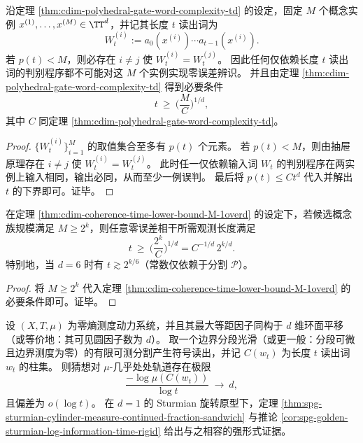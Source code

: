 \begin{theorem}[圆维诱导的零误差相干下界]\label{thm:cdim-coherence-time-lower-bound-M-1overd}
沿定理 \ref{thm:cdim-polyhedral-gate-word-complexity-td} 的设定，固定 \(M\) 个概念实例 \(x^{(1)},\dots,x^{(M)}\in\TT^d\)，并记其长度 \(t\) 读出词为
\[
W_t^{(i)}:=a_0(x^{(i)})\cdots a_{t-1}(x^{(i)}).
\]
若 \(p(t)<M\)，则必存在 \(i\neq j\) 使 \(W_t^{(i)}=W_t^{(j)}\)。
因此任何仅依赖长度 \(t\) 读出词的判别程序都不可能对这 \(M\) 个实例实现零误差辨识。
并且由定理 \ref{thm:cdim-polyhedral-gate-word-complexity-td} 得到必要条件
\[
t\ \ge\ \Big(\frac{M}{C}\Big)^{1/d},
\]
其中 \(C\) 同定理 \ref{thm:cdim-polyhedral-gate-word-complexity-td}。
\end{theorem}
\begin{proof}
\(\{W_t^{(i)}\}_{i=1}^{M}\) 的取值集合至多有 \(p(t)\) 个元素。
若 \(p(t)<M\)，则由抽屉原理存在 \(i\neq j\) 使 \(W_t^{(i)}=W_t^{(j)}\)。
此时任一仅依赖输入词 \(W_t\) 的判别程序在两实例上输入相同，输出必同，从而至少一例误判。
最后将 \(p(t)\le Ct^d\) 代入并解出 \(t\) 的下界即可。证毕。
\end{proof}

\begin{corollary}[复杂度先验下的相干时间壁垒]\label{cor:cdim-coherence-time-barrier-2power-k-over-d}
在定理 \ref{thm:cdim-coherence-time-lower-bound-M-1overd} 的设定下，若候选概念族规模满足 \(M\ge 2^k\)，则任意零误差相干所需观测长度满足
\[
t\ \ge\ \Big(\frac{2^k}{C}\Big)^{1/d}=C^{-1/d}\,2^{k/d}.
\]
特别地，当 \(d=6\) 时有 \(t\gtrsim 2^{k/6}\)（常数仅依赖于分割 \(\mathcal P\)）。
\end{corollary}
\begin{proof}
将 \(M\ge 2^k\) 代入定理 \ref{thm:cdim-coherence-time-lower-bound-M-1overd} 的必要条件即可。证毕。
\end{proof}

\begin{conjecture}[圆维与对数信息时间的首阶系数律]\label{conj:cdim-log-information-time-leading-coefficient}
设 \((X,T,\mu)\) 为零熵测度动力系统，并且其最大等距因子同构于 \(d\) 维环面平移（或等价地：其可见圆因子数为 \(d\)）。
取一个边界分段光滑（或更一般：分段可微且边界测度为零）的有限可测分割产生符号读出，并记 \(C(w_t)\) 为长度 \(t\) 读出词 \(w_t\) 的柱集。
则猜想对 \(\mu\)-几乎处处轨道存在极限
\[
\frac{-\log\mu(C(w_t))}{\log t}\ \longrightarrow\ d,
\]
且偏差为 \(o(\log t)\)。
在 \(d=1\) 的 Sturmian 旋转原型下，定理 \ref{thm:spg-sturmian-cylinder-measure-continued-fraction-sandwich} 与推论 \ref{cor:spg-golden-sturmian-log-information-time-rigid} 给出与之相容的强形式证据。
\end{conjecture}
